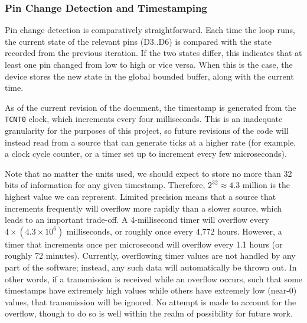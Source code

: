 \documentclass[12pt]{article}
\begin{document}
%
%
%

\subsubsection{Pin Change Detection and Timestamping}

Pin change detection is comparatively straightforward.
Each time the loop runs, the current state of the relevant pins (D3..D6) is
compared with the state recorded from the previous iteration.
If the two states differ, this indicates that at least one pin changed from
low to high or vice versa.
When this is the case, the device stores the new state in the global bounded
buffer, along with the current time.

As of the current revision of the document, the timestamp is generated from
the \texttt{TCNT0} clock, which increments every four milliseconds.
This is an inadequate granularity for the purposes of this project, so future
revisions of the code will instead read from a source that can generate ticks
at a higher rate (for example, a clock cycle counter, or a timer set up to
increment every few microseconds).

Note that no matter the units used, we should expect to store no more than 32
bits of information for any given timestamp.
Therefore, $2^{32} \approx 4.3$ million is the highest value we can represent.
Limited precision means that a source that increments frequently will overflow
more rapidly than a slower source, which leads to an important trade-off.
A 4-millisecond timer will overflow every $4\times (4.3\times 10^6)$
milliseconds, or roughly once every 4,772 hours.
However, a timer that increments once per microsecond will overflow every 1.1
hours (or roughly 72 minutes).
Currently, overflowing timer values are not handled by any part of the
software; instead, any such data will automatically be thrown out.
In other words, if a transmission is received while an overflow occurs, such
that some timestamps have extremely high values while others have extremely
low (near-0) values, that transmission will be ignored.
No attempt is made to account for the overflow, though to do so is well within
the realm of possibility for future work.
\end{document}
